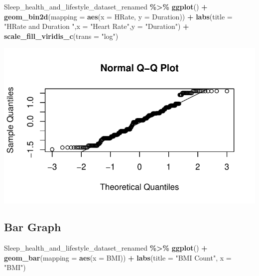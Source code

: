 \documentclass[
  11pt,
]{article}
\newenvironment{Shaded}{\begin{snugshade}}{\end{snugshade}}
\newcommand{\AttributeTok}[1]{\textcolor[rgb]{0.13,0.29,0.53}{#1}}
\newcommand{\FunctionTok}[1]{\textcolor[rgb]{0.13,0.29,0.53}{\textbf{#1}}}
\newcommand{\NormalTok}[1]{#1}
\newcommand{\SpecialCharTok}[1]{\textcolor[rgb]{0.81,0.36,0.00}{\textbf{#1}}}
\newcommand{\StringTok}[1]{\textcolor[rgb]{0.31,0.60,0.02}{#1}}
\begin{document}
\begin{Shaded}
\begin{Highlighting}[]
\NormalTok{Sleep\_health\_and\_lifestyle\_dataset\_renamed }\SpecialCharTok{\%\textgreater{}\%}
  \FunctionTok{ggplot}\NormalTok{() }\SpecialCharTok{+}
  \FunctionTok{geom\_bin2d}\NormalTok{(}\AttributeTok{mapping =} \FunctionTok{aes}\NormalTok{(}\AttributeTok{x =}\NormalTok{ HRate, }\AttributeTok{y =}\NormalTok{ Duration)) }\SpecialCharTok{+}
  \FunctionTok{labs}\NormalTok{(}\AttributeTok{title =} \StringTok{"HRate and Duration "}\NormalTok{,}\AttributeTok{x =} \StringTok{"Heart Rate"}\NormalTok{,}\AttributeTok{y =} \StringTok{"Duration"}\NormalTok{) }\SpecialCharTok{+} \FunctionTok{scale\_fill\_viridis\_c}\NormalTok{(}\AttributeTok{trans =} \StringTok{"log"}\NormalTok{)}
\end{Highlighting}
\end{Shaded}

\begin{center}\includegraphics[width=0.7\linewidth]{SleepHelath_files/figure-latex/unnamed-chunk-25-1} \end{center}

\hypertarget{bar-graph}{%
\subsection{Bar Graph}\label{bar-graph}}

\begin{Shaded}
\begin{Highlighting}[]
\NormalTok{Sleep\_health\_and\_lifestyle\_dataset\_renamed }\SpecialCharTok{\%\textgreater{}\%}
  \FunctionTok{ggplot}\NormalTok{() }\SpecialCharTok{+}
    \FunctionTok{geom\_bar}\NormalTok{(}\AttributeTok{mapping =} \FunctionTok{aes}\NormalTok{(}\AttributeTok{x =}\NormalTok{ BMI)) }\SpecialCharTok{+}
    \FunctionTok{labs}\NormalTok{(}\AttributeTok{title =} \StringTok{"BMI Count"}\NormalTok{, }\AttributeTok{x =} \StringTok{"BMI"}\NormalTok{)}
\end{Highlighting}
\end{Shaded}
\end{document}
